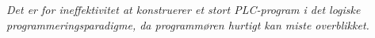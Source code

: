 \noindent \textit{Det er for ineffektivitet at konstruerer et stort PLC-program i det logiske programmeringsparadigme, da programmøren hurtigt kan miste overblikket.}








